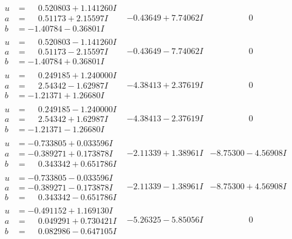 \documentclass[1p]{elsarticle_modified}
\theoremstyle{definition}
\begin{document}
$$\begin{array}{c|c|c}
\begin{aligned}
u &= \phantom{-}0.520803 + 1.141260 I \\
a &= \phantom{-}0.51173 + 2.15597 I \\
b &= -1.40784 - 0.36801 I\end{aligned}
 & -0.43649 + 7.74062 I & \phantom{-0.000000 } 0 \\ \hline\begin{aligned}
u &= \phantom{-}0.520803 - 1.141260 I \\
a &= \phantom{-}0.51173 - 2.15597 I \\
b &= -1.40784 + 0.36801 I\end{aligned}
 & -0.43649 - 7.74062 I & \phantom{-0.000000 } 0 \\ \hline\begin{aligned}
u &= \phantom{-}0.249185 + 1.240000 I \\
a &= \phantom{-}2.54342 - 1.62987 I \\
b &= -1.21371 + 1.26680 I\end{aligned}
 & -4.38413 + 2.37619 I & \phantom{-0.000000 } 0 \\ \hline\begin{aligned}
u &= \phantom{-}0.249185 - 1.240000 I \\
a &= \phantom{-}2.54342 + 1.62987 I \\
b &= -1.21371 - 1.26680 I\end{aligned}
 & -4.38413 - 2.37619 I & \phantom{-0.000000 } 0 \\ \hline\begin{aligned}
u &= -0.733805 + 0.033596 I \\
a &= -0.389271 + 0.173878 I \\
b &= \phantom{-}0.343342 + 0.651786 I\end{aligned}
 & -2.11339 + 1.38961 I & -8.75300 - 4.56908 I \\ \hline\begin{aligned}
u &= -0.733805 - 0.033596 I \\
a &= -0.389271 - 0.173878 I \\
b &= \phantom{-}0.343342 - 0.651786 I\end{aligned}
 & -2.11339 - 1.38961 I & -8.75300 + 4.56908 I \\ \hline\begin{aligned}
u &= -0.491152 + 1.169130 I \\
a &= \phantom{-}0.049291 + 0.730421 I \\
b &= \phantom{-}0.082986 - 0.647105 I\end{aligned}
 & -5.26325 - 5.85056 I & \phantom{-0.000000 } 0 \\ \hline\begin{aligned}

\end{aligned}
\end{array}$$
\end{document}
